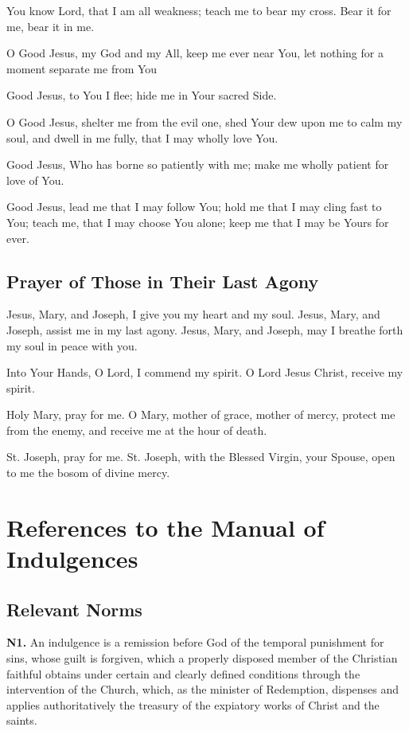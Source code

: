 \documentclass[12pt]{article}
\newif\ifxetexorluatex
\newcommand{\prayertitle}[1]{\subsection{#1}}
\newcommand{\sectionsign}{%
	\ifxetexorluatex%
		{\setmainfont{Times New Roman}§}%
	\else%
		§
	\fi
}
\begin{document}
You know Lord, that I am all weakness; teach me to bear my cross.
Bear it for me, bear it in me.

O Good Jesus, my God and my All, keep me ever near You, let nothing for a moment separate me from You

Good Jesus, to You I flee;
hide me in Your sacred Side.

O Good Jesus, shelter me from the evil one, shed Your dew upon me to calm my soul, and dwell in me fully, that I may wholly love You.

Good Jesus, Who has borne so patiently with me;
make me wholly patient for love of You.

Good Jesus, lead me that I may follow You; hold me that I may cling fast to You;
teach me, that I may choose You alone; keep me that I may be Yours for ever.

\prayertitle{Prayer of Those in Their Last Agony}
Jesus, Mary, and Joseph, I give you my heart and my soul.
Jesus, Mary, and Joseph, assist me in my last agony.
Jesus, Mary, and Joseph, may I breathe forth my soul in peace with you.

Into Your Hands, O Lord, I commend my spirit.
O Lord Jesus Christ, receive my spirit.

Holy Mary, pray for me.
O Mary, mother of grace, mother of mercy, protect me from the enemy, and receive me at the hour of death.

St. Joseph, pray for me.
St. Joseph, with the Blessed Virgin, your Spouse, open to me the bosom of divine mercy.


\newpage
\appendix
\section{References to the Manual of Indulgences}
\subsection{Relevant Norms}
\newcommand{\norm}[1]{\textbf{N#1.}\newline}
\newcommand{\subnorm}[1]{\sectionsign{}#1.}
\norm{1}
An indulgence is a remission before God of the temporal punishment for sins, whose guilt is forgiven, which a properly disposed member of the Christian faithful obtains under certain and clearly defined conditions through the intervention of the Church, which, as the minister of Redemption, dispenses and applies authoritatively the treasury of the expiatory works of Christ and the saints.
\end{document}
